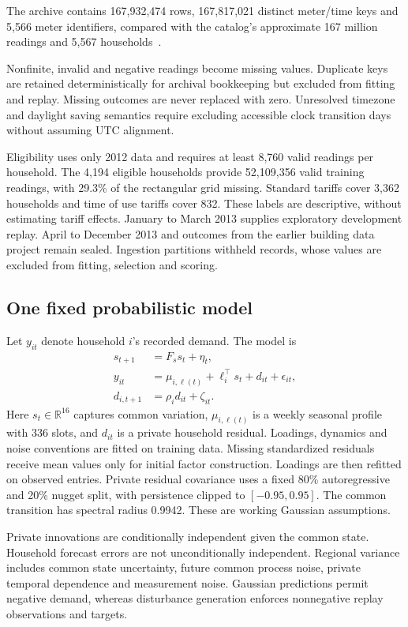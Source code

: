 \documentclass[conference]{IEEEtran}
\newcommand{\R}{\mathbb{R}}
\begin{document}
The archive contains 167,932,474 rows, 167,817,021 distinct meter/time keys and 5,566 meter identifiers, compared with the catalog's approximate 167 million readings and 5,567 households~\cite{london}.

Nonfinite, invalid and negative readings become missing values. Duplicate keys are retained deterministically for archival bookkeeping but excluded from fitting and replay. Missing outcomes are never replaced with zero. Unresolved timezone and daylight saving semantics require excluding accessible clock transition days without assuming UTC alignment.

Eligibility uses only 2012 data and requires at least 8,760 valid readings per household. The 4,194 eligible households provide 52,109,356 valid training readings, with 29.3\% of the rectangular grid missing. Standard tariffs cover 3,362 households and time of use tariffs cover 832. These labels are descriptive, without estimating tariff effects. January to March 2013 supplies exploratory development replay. April to December 2013 and outcomes from the earlier building data project remain sealed. Ingestion partitions withheld records, whose values are excluded from fitting, selection and scoring.

\subsection{One fixed probabilistic model}
Let $y_{it}$ denote household $i$'s recorded demand. The model is
\begin{align}
 s_{t+1}&=F_s s_t+\eta_t,\\
 y_{it}&=\mu_{i,\ell(t)}+\ell_i^\top s_t+d_{it}+\epsilon_{it},\label{eq:model}\\
 d_{i,t+1}&=\rho_i d_{it}+\zeta_{it}.
\end{align}
Here $s_t\in\R^{16}$ captures common variation, $\mu_{i,\ell(t)}$ is a weekly seasonal profile with 336 slots, and $d_{it}$ is a private household residual. Loadings, dynamics and noise conventions are fitted on training data. Missing standardized residuals receive mean values only for initial factor construction. Loadings are then refitted on observed entries. Private residual covariance uses a fixed 80\% autoregressive and 20\% nugget split, with persistence clipped to $[-0.95,0.95]$. The common transition has spectral radius 0.9942. These are working Gaussian assumptions.

Private innovations are conditionally independent given the common state. Household forecast errors are not unconditionally independent. Regional variance includes common state uncertainty, future common process noise, private temporal dependence and measurement noise. Gaussian predictions permit negative demand, whereas disturbance generation enforces nonnegative replay observations and targets.
\end{document}
